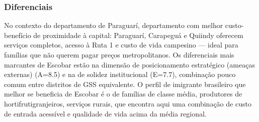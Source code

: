 \subsubsection*{Diferenciais}\label{dif-escobar-0906}
No contexto do departamento de Paraguarí, departamento com melhor custo-benefício de proximidade à capital: Paraguarí, Carapeguá e Quiindy oferecem serviços completos, acesso à Ruta 1 e custo de vida campesino — ideal para famílias que não querem pagar preços metropolitanos. Os diferenciais mais marcantes de Escobar estão na dimensão de posicionamento estratégico (ameaças externas) (A=8.5) e na de solidez institucional (E=7.7), combinação pouco comum entre distritos de GSS equivalente. O perfil de imigrante brasileiro que melhor se beneficia de Escobar é o de famílias de classe média, produtores de hortifrutigranjeiros, serviços rurais, que encontra aqui uma combinação de custo de entrada acessível e qualidade de vida acima da média regional.
